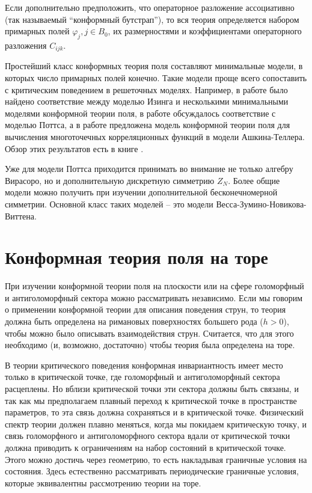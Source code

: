 Если дополнительно предположить, что операторное разложение ассоциативно (так называемый ``конформный бутстрап''), то вся теория определяется набором примарных полей $\varphi_{j}, j\in B_{0}$, их размерностями и коэффициентами операторного разложения $C_{ijk}$.

Простейший класс конформных теория поля составляют минимальные модели, в которых число примарных полей конечно. Такие модели проще всего сопоставить с критическим поведением в решеточных моделях. Например, в работе \cite{belavin1984ics} было найдено соответствие между моделью Изинга и несколькими минимальными моделями конформной теории поля, в работе \cite{zamolodchikov1987representations} обсуждалось соответствие с моделью Поттса, а в работе \cite{zamolodchikov1987conformal} предложена модель конформной теории поля для вычисления многоточечных корреляционных функций в модели Ашкина-Теллера. Обзор этих результатов есть в книге \cite{difrancesco1997cft}.

 Уже для модели Поттса приходится принимать во внимание не только алгебру Вирасоро, но и дополнительную дискретную симметрию $Z_{N}$. Более общие модели можно получить при изучении дополнительной бесконечномерной симметрии. Основной класс таких моделей -- это модели Весса-Зумино-Новикова-Виттена. 

\section{Конформная теория поля на торе}
\label{sec:nnn}

При изучении конформной теории поля на плоскости или на сфере 
голоморфный и антиголоморфный сектора можно рассматривать независимо. 
Если мы говорим о применении конформной теории для описания поведения струн, то теория должна быть
определена на римановых поверхностях большего рода ($h>0$), чтобы можно было описывать
взаимодействия струн. Считается, что для этого необходимо (и, возможно, достаточно) чтобы теория была определена на торе.

В теории критического поведения конформная инвариантность имеет место только в критической точке,
где голоморфный и антиголоморфный сектора расцеплены. Но вблизи критической точки эти сектора должны
быть связаны, и так как мы предполагаем плавный переход к критической точке в пространстве
параметров, то эта связь должна сохраняться и в критической точке. Физический спектр теории должен
плавно меняться, когда мы покидаем критическую точку, и связь голоморфного и антиголоморфного
сектора вдали от критической точки должна приводить к ограничениям на набор состояний в критической
точке. Этого можно достичь через геометрию, то есть накладывая граничные условия на состояния. Здесь
естественно рассматривать периодические граничные условия, которые эквивалентны рассмотрению теории
на торе.

